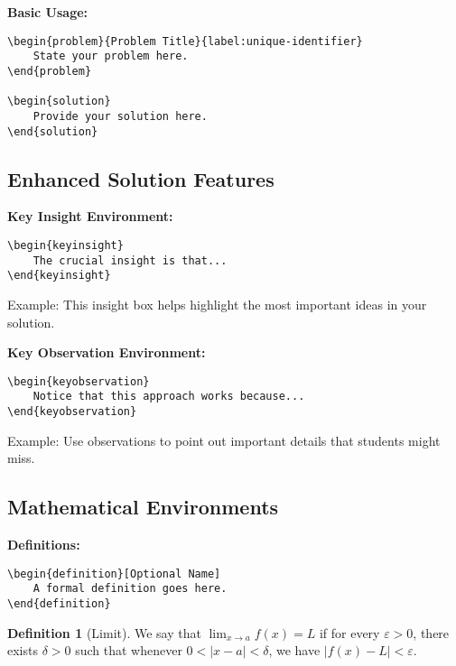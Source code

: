 \documentclass[11pt, oneside, openany]{book}
\theoremstyle{definition}
\newtheorem{definition}{Definition}[section]
\begin{document}
\textbf{Basic Usage:}
\begin{verbatim}
\begin{problem}{Problem Title}{label:unique-identifier}
    State your problem here.
\end{problem}

\begin{solution}
    Provide your solution here.
\end{solution}
\end{verbatim}

\subsection*{Enhanced Solution Features}

\textbf{Key Insight Environment:}
\begin{verbatim}
\begin{keyinsight}
    The crucial insight is that...
\end{keyinsight}
\end{verbatim}

\begin{keyinsight}
    Example: This insight box helps highlight the most important ideas in your solution.
\end{keyinsight}

\textbf{Key Observation Environment:}
\begin{verbatim}
\begin{keyobservation}
    Notice that this approach works because...
\end{keyobservation}
\end{verbatim}

\begin{keyobservation}
    Example: Use observations to point out important details that students might miss.
\end{keyobservation}

\subsection*{Mathematical Environments}

\textbf{Definitions:}
\begin{verbatim}
\begin{definition}[Optional Name]
    A formal definition goes here.
\end{definition}
\end{verbatim}

\begin{definition}[Limit]
    We say that $\lim_{x \to a} f(x) = L$ if for every $\varepsilon > 0$, there exists $\delta > 0$ such that whenever $0 < |x - a| < \delta$, we have $|f(x) - L| < \varepsilon$.
\end{definition}
\end{document}
